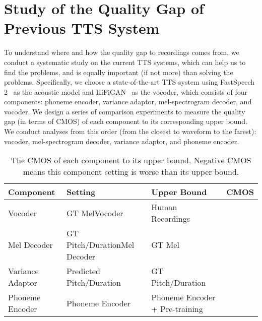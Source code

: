 \documentclass{article}
\theoremstyle{definition}
\begin{document}







\appendix





\section{Study of the Quality Gap of Previous TTS System}
\label{appendix_study}
To understand where and how the quality gap to recordings comes from, we conduct a systematic study on the current TTS systems, which can help us to find the problems, and is equally important (if not more) than solving the problems. Specifically, we choose a state-of-the-art TTS system using FastSpeech 2~\cite{ren2021fastspeech} as the acoustic model and HiFiGAN~\cite{kong2020hifi} as the vocoder, which consists of four components: phoneme encoder, variance adaptor, mel-spectrogram decoder, and vocoder. We design a series of comparison experiments to measure the quality gap (in terms of CMOS) of each component to its corresponding upper bound. We conduct analyses from this order (from the closest to waveform to the farest): vocoder, mel-spectrogram decoder, variance adaptor, and phoneme encoder. 

\begin{table}[h!]
\small
	\caption{The CMOS of each component to its upper bound. Negative CMOS means this component setting is worse than its upper bound.}
	\centering
	\begin{tabular}{ l l l l}
		\toprule
	    Component & Setting & Upper Bound & CMOS   \\
		\midrule
		Vocoder  & GT MelVocoder & Human Recordings &  \\
		Mel Decoder & GT Pitch/DurationMel Decoder & GT Mel &   \\
		Variance Adaptor & Predicted Pitch/Duration & GT Pitch/Duration &  \\
		Phoneme Encoder & Phoneme Encoder & Phoneme Encoder + Pre-training &  \\
		\bottomrule
	\end{tabular}
	\vspace{0.3cm}
	\label{tab_study_on_quality_drop}
\end{table}
\end{document}
